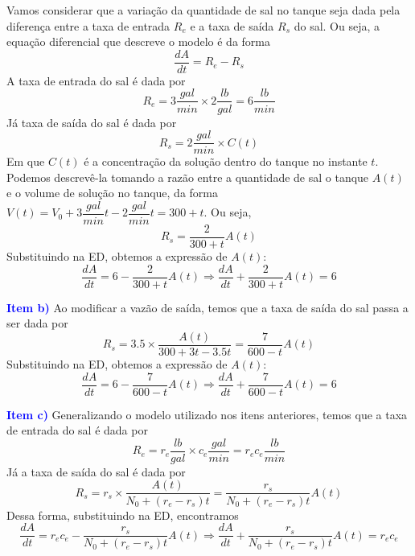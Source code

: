 \documentclass[oneside,12pt,a4paper]{report}
\begin{document}
\begin{tcolorbox}[enhanced, breakable, colback=blue!1!white,colframe=blue!75!black,title=\textbf{\hyperlink{quest:ex11}{\hypertarget{resp:ex11}{Exercício 11}}}]
            \noindent Vamos considerar que a variação da quantidade de sal no tanque seja dada pela diferença entre a taxa de entrada $R_e$ e a taxa de saída $R_s$ do sal. Ou seja, a equação diferencial que descreve o modelo é da forma
            \[\frac{dA}{dt} = R_e - R_s\]
            \noindent A taxa de entrada do sal é dada por
            \[R_e = 3\frac{gal}{min} \times 2\frac{lb}{gal} = 6\frac{lb}{min}\]
            \noindent Já taxa de saída do sal é dada por
            \[R_s = 2\frac{gal}{min} \times C(t)\]
            \noindent Em que $C(t)$ é a concentração da solução dentro do tanque no instante $t$. Podemos descrevê-la tomando a razão entre a quantidade de sal o tanque $A(t)$ e o volume de solução no tanque, da forma $V(t)=V_0+3\dfrac{gal}{min}t-2\dfrac{gal}{min}t=300+t$. Ou seja,
            \[R_s=\frac{2}{300+t}A(t)\]
            \noindent Substituindo na ED, obtemos a expressão de $A(t)$:
            \[\frac{dA}{dt} = 6 - \frac{2}{300+t}A(t)\Rightarrow\boxed{\frac{dA}{dt} + \frac{2}{300+t}A(t) = 6}\]
            
            \noindent\textcolor{blue}{\textbf{Item b)}} Ao modificar a vazão de saída, temos que a taxa de saída do sal passa a ser dada por
            \[R_s = 3.5 \times \frac{A(t)}{300+3t-3.5t}=\frac{7}{600-t}A(t)\]
            \noindent Substituindo na ED, obtemos a expressão de $A(t)$:
            \[\frac{dA}{dt} = 6 - \frac{7}{600-t}A(t)\Rightarrow\boxed{\frac{dA}{dt} + \frac{7}{600-t}A(t) = 6}\]

            \noindent\textcolor{blue}{\textbf{Item c)}} Generalizando o modelo utilizado nos itens anteriores, temos que a taxa de entrada do sal é dada por
            \[R_e = r_e\frac{lb}{gal} \times c_e\frac{gal}{min} = r_ec_e\frac{lb}{min}\]
            \noindent Já a taxa de saída do sal é dada por
            \[R_s = r_s \times \frac{A(t)}{N_0+(r_e-r_s)t}=\frac{r_s}{N_0+(r_e-r_s)t}A(t)\]
            \noindent Dessa forma, substituindo na ED, encontramos
            \[\frac{dA}{dt}=r_ec_e-\frac{r_s}{N_0+(r_e-r_s)t}A(t)\Rightarrow\boxed{\frac{dA}{dt} + \frac{r_s}{N_0+(r_e-r_s)t}A(t) = r_ec_e}\]
        \end{tcolorbox}
\end{document}
